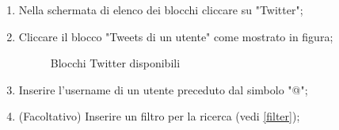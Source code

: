 \newpage
\begin{enumerate}
	\item Nella schermata di elenco dei blocchi cliccare su "Twitter";
	\item Cliccare il blocco "Tweets di un utente" come mostrato in figura;
	\begin{figure}[!ht]
		\centering
		\caption{Blocchi Twitter disponibili}
	\end{figure}
	\newpage
	\item Inserire l'username di un utente preceduto dal simbolo "@";
	\item (Facoltativo) Inserire un filtro per la ricerca (vedi \ref{filter});

\end{enumerate}
